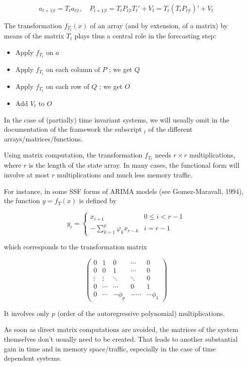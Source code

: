 \documentclass[
  letterpaper,
  DIV=11,
  numbers=noendperiod]{scrreprt}
\providecommand{\tightlist}{%
  \setlength{\itemsep}{0pt}\setlength{\parskip}{0pt}}
\begin{document}
\[ a_{t+1 \vert t}=T_t a_{t \vert t}, \quad P_{t+1 \vert t}=T_t P_{t \vert t} T_t'+V_t=T_t \left(T_t P_{t \vert t} \right)'+V_t \]

The transformation \(f_{T_t} (x)\) of an array (and by extension, of a
matrix) by means of the matrix \(T_t\) plays thus a central role in the
forecasting step:

\begin{itemize}
\tightlist
\item
  Apply \(f_{T_t}\) on \(a\)
\item
  Apply \(f_{T_t}\) on each column of \(P\) ; we get \(Q\)
\item
  Apply \(f_{T_t}\) on each row of \(Q\) ; we get \(O\)
\item
  Add \(V_t\) to \(O\)
\end{itemize}

In the case of (partially) time invariant systems, we will usually omit
in the documentation of the framework the subscript \(_t\) of the
different arrays/matrices/functions.

Using matrix computation, the transformation \(f_{T_t}\) needs
\(r \times r\) multiplications, where \(r\) is the length of the state
array. In many cases, the functional form will involve at most \(r\)
multiplications and much less memory traffic.

For instance, in some SSF forms of ARIMA models (see Gomez-Maravall,
1994), the function \(y=f_T(x)\) is defined by

\[ y_i = \begin{cases} x_{i+1} & 0 \le i < r-1  \\ -\sum_{k=1}^p {\varphi_k x_{r-k} } & i =r-1\end{cases} \]

which corresponds to the transformation matrix

\[
\begin{pmatrix}
0 & 1 & 0 & \cdots & 0 \\
0 & 0 & 1 & \cdots & 0 \\
\vdots & \vdots & \ddots & \ddots & 0 \\
0 & \cdots & \cdots & 0 & 1 \\
0 & \cdots & -\phi_p & - \cdots & -\phi_1
\end{pmatrix}
\]

It involves only \(p\) (order of the autoregressive polynomial)
multiplications.

As soon as direct matrix computations are avoided, the matrices of the
system themselves don't usually need to be created. That leads to
another substantial gain in time and in memory space/traffic, especially
in the case of time dependent systems.
\end{document}
